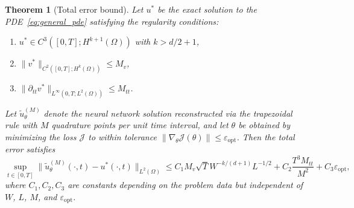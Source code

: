 \documentclass[11pt,reqno]{amsart}
\theoremstyle{plain}
\newtheorem{theorem}{Theorem}[section]
\theoremstyle{definition}
\theoremstyle{remark}
\begin{document}
\begin{theorem}[Total error bound]\label{thm:total_error}
Let $u^*$ be the exact solution to the PDE~\eqref{eq:general_pde} satisfying the regularity conditions:
\begin{enumerate}[label=(\roman*)]
    \item $u^* \in C^3([0,T]; H^{k+1}(\Omega))$ with $k > d/2 + 1$,
    \item $\|v^*\|_{C^2([0,T]; H^k(\Omega))} \leq M_v$,
    \item $\|\partial_{tt} v^*\|_{L^\infty(0,T; L^2(\Omega))} \leq M_{tt}$.
\end{enumerate}
Let $\tilde{u}_\theta^{(M)}$ denote the neural network solution reconstructed via the trapezoidal rule with $M$ quadrature points per unit time interval, and let $\theta$ be obtained by minimizing the loss $\mathcal{J}$ to within tolerance $\|\nabla_\theta \mathcal{J}(\theta)\| \leq \varepsilon_{\mathrm{opt}}$. Then the total error satisfies
\begin{equation}\label{eq:total_error_bound}
    \sup_{t \in [0,T]} \|\tilde{u}_\theta^{(M)}(\cdot, t) - u^*(\cdot, t)\|_{L^2(\Omega)} \leq C_1 M_v \sqrt{T} W^{-k/(d+1)} L^{-1/2} + C_2 \frac{T^3 M_{tt}}{M^2} + C_3 \varepsilon_{\mathrm{opt}},
\end{equation}
where $C_1, C_2, C_3$ are constants depending on the problem data but independent of $W$, $L$, $M$, and $\varepsilon_{\mathrm{opt}}$.
\end{theorem}
\end{document}
